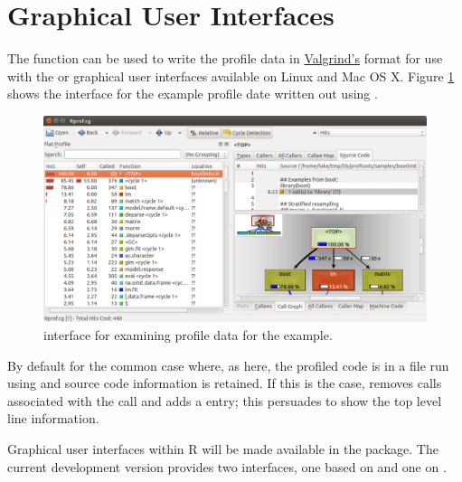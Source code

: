 \documentclass[nojss]{jss}\usepackage[]{graphicx}\usepackage[]{color}
\makeatletter
\def\maxwidth{ %
  \ifdim\Gin@nat@width>\linewidth
    \linewidth
  \else
    \Gin@nat@width
  \fi
}
\makeatother
\begin{document}
\section{Graphical User Interfaces}
The function  can be used to write the
profile data in \href{valgrind.org}{Valgrind's} 
format for use with the
\href{http://kcachegrind.sourceforge.net/html/Home.html}{}
or  graphical user interfaces available on Linux and
Mac OS X. Figure \ref{kcachegrindFig} shows the 
interface for the example profile date written out using
.
\begin{figure}
  \centering
  \includegraphics[width=\maxwidth]{kcachegrind}
  \caption{ interface for examining profile data for
    the example.}
\label{kcachegrindFig}
\end{figure}
By default  for the common case where, as
here, the profiled code is in a file run using  and
source code information is retained. If this is the case,
 removes calls associated with the
 call and adds a  entry; this persuades
 to show the top level line information.

Graphical user interfaces within R will be made available in the
\href{https://github.com/ltierney/Rpkg-proftools-GUI}{}
package. The current development version provides two interfaces, one
based on  \citep{Verzani:gWidgets2} and one on
 \citep{Chang:shiny}.


\end{document}
